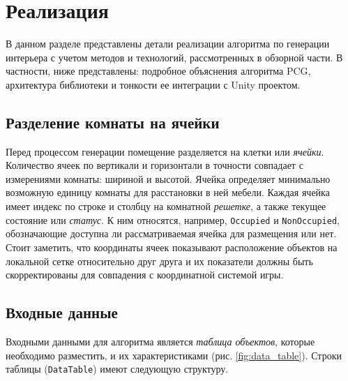 
\section{Реализация}

В данном разделе представлены детали реализации алгоритма по генерации интерьера с учетом методов и технологий, рассмотренных в обзорной части. В частности, ниже представлены: подробное объяснения алгоритма PCG, архитектура библиотеки и тонкости ее интеграции с Unity проектом.

\subsection{Разделение комнаты на ячейки}

Перед процессом генерации помещение разделяется на клетки или \textit{ячейки}. Количество ячеек по вертикали и горизонтали в точности совпадает с измерениями комнаты: шириной и высотой. Ячейка определяет минимально возможную единицу комнаты для расстановки в ней мебели. Каждая ячейка имеет индекс по строке и столбцу на комнатной \textit{решетке}, а также текущее состояние или \textit{статус}. К ним относятся, например, \texttt{Occupied} и \texttt{NonOccupied}, обозначающие доступна ли рассматриваемая ячейка для размещения или нет. Стоит заметить, что координаты ячеек показывают расположение объектов на локальной сетке относительно друг друга и их показатели должны быть скорректированы для совпадения с координатной системой игры.

\subsection{Входные данные}
Входными данными для алгоритма является \textit{таблица объектов}, которые необходимо разместить, и их характеристиками (рис. \ref{fig:data_table}). Строки таблицы (\texttt{DataTable}) имеют следующую структуру.

